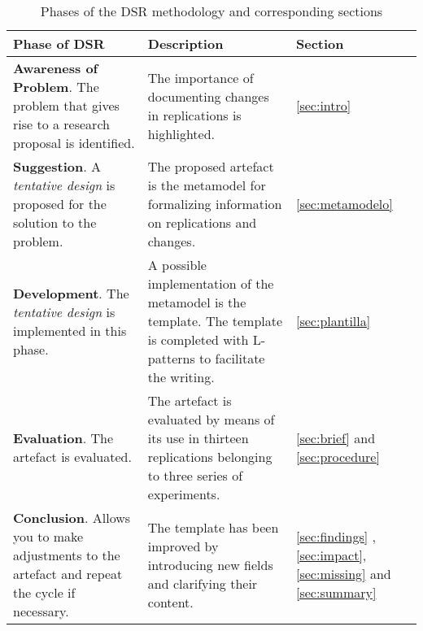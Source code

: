\begin{table}
\caption{Phases of the DSR methodology \cite{Vaishnavi} and corresponding sections}
\label{tab:fases}
\begin{minipage}{6cm}

\begin{tabular}{| p{5.3 cm} | p{5.3 cm} |p{1.2cm} |} \hline

\textbf{Phase of DSR} & \textbf{Description}   &  \textbf{Section}  \\ \hline

\textbf{Awareness of Problem}. The problem that gives rise to a research proposal is identified. & The importance of documenting changes in replications is highlighted. 

&  \ref{sec:intro}  \\ \hline
\textbf{Suggestion}.  A \emph{tentative design} is proposed for the solution to the problem. & The proposed artefact is the metamodel for formalizing information on replications and changes.%

& \ref{sec:metamodelo} \\ \hline
\textbf{Development}. The \emph{tentative design} is implemented in this phase. & A possible implementation of the metamodel is the template. The template is completed with L-patterns to facilitate the writing.

& \ref{sec:plantilla} \\ \hline
\textbf{Evaluation}. The artefact is evaluated. & The artefact is evaluated by means of its use in thirteen replications belonging to three series of experiments.
& \ref{sec:brief} and \ref{sec:procedure} \\ \hline

\textbf{Conclusion}. Allows you to make adjustments to the artefact and repeat the cycle if necessary. & The  template has  been  improved  by  introducing  new  fields  and  clarifying  their content.

& %
\ref{sec:findings} ,  \ref{sec:impact}, \ref{sec:missing} and \ref{sec:summary}   \\ \hline

\end{tabular}
\end{minipage}

\end{table}


